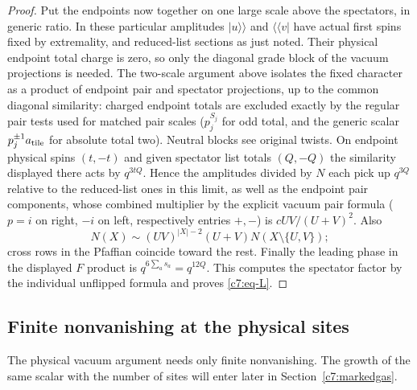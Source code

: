 \begin{proof}
Put the endpoints now together on one large scale above the spectators, in generic ratio. In these particular amplitudes $|u\rangle\rangle$ and $\langle\langle v|$ have actual first spins fixed by extremality, and reduced-list sections as just noted. Their physical endpoint total charge is zero, so only the diagonal grade block of the vacuum projections is needed. The two-scale argument above isolates the fixed character as a product of endpoint pair and spectator projections, up to the common diagonal similarity: charged endpoint totals are excluded exactly by the regular pair tests used for matched pair scales ($p_j^{S_j}$ for odd total, and the generic scalar $p_j^{\pm1}a_{\rm tile}$ for absolute total two). Neutral blocks see original twists. On endpoint physical spins $(t,-t)$ and given spectator list totals $(Q,-Q)$ the similarity displayed there acts by $q^{3tQ}$. Hence the amplitudes divided by $N$ each pick up $q^{3Q}$ relative to the reduced-list ones in this limit, as well as the endpoint pair components, whose combined multiplier by the explicit vacuum pair formula ($p=i$ on right, $-i$ on left, respectively entries $+,-$) is $cUV/(U+V)^2$. Also
\[
N(X)\sim (UV)^{|X|-2}(U+V) N(X\setminus\{U,V\});
\]
cross rows in the Pfaffian coincide toward the rest. Finally the leading phase in the displayed $F$ product is $q^{6\sum_a s_a}=q^{12Q}$. This computes the spectator factor by the individual unflipped formula and proves \eqref{c7:eq-L}.
\end{proof}

\subsection{Finite nonvanishing at the physical sites}

The physical vacuum argument needs only finite nonvanishing. The
growth of the same scalar with the number of sites will enter later
in Section~\ref{c7:markedgas}.

